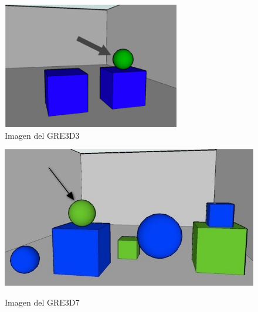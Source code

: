 \begin{figure}
\begin{minipage}[b]{0.5\linewidth}
\centering
\includegraphics[width=\textwidth]{images/GRE3D3.png}\\[0pt]
\caption{Imagen del GRE3D3}
\label{fig-GRE3D3}
\vspace*{-0.7cm}
\end{minipage}
\hspace*{0cm}
\begin{minipage}[b]{0.5\linewidth}
\centering
\includegraphics[width=\textwidth]{images/3.jpg}\\[0pt]
\caption{Imagen del GRE3D7}
\label{fig-GRE3D7}
\end{minipage}
\end{figure}


